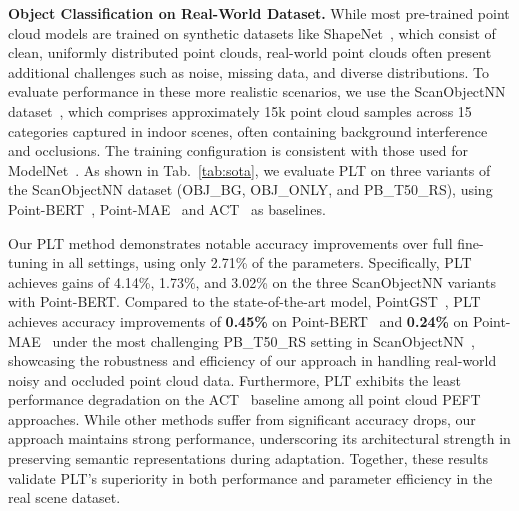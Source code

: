 
\textbf{Object Classification on Real-World Dataset.} While most pre-trained point cloud models are trained on synthetic datasets like ShapeNet~\cite{chang2015shapenet}, which consist of clean, uniformly distributed point clouds, real-world point clouds often present additional challenges such as noise, missing data, and diverse distributions. To evaluate performance in these more realistic scenarios, we use the ScanObjectNN dataset~\cite{uy2019revisiting}, which comprises approximately 15k point cloud samples across 15 categories captured in indoor scenes, often containing background interference and occlusions. The training configuration is consistent with those used for ModelNet~\cite{wu20153d}. As shown in Tab.~\ref{tab:sota}, we evaluate PLT on three variants of the ScanObjectNN dataset (OBJ\_BG, OBJ\_ONLY, and PB\_T50\_RS), using Point-BERT~\cite{yu2022point},  Point-MAE~\cite{pang2022masked} and ACT~\cite{dong2022autoencoders} as baselines.

Our PLT method demonstrates notable accuracy improvements over full fine-tuning in all settings, using only 2.71\% of the parameters. 
Specifically, PLT achieves gains of 4.14\%, 1.73\%, and 3.02\% on the three ScanObjectNN variants with Point-BERT. 
Compared to the state-of-the-art model, PointGST~\cite{liang2024parameter}, PLT achieves accuracy improvements of \textbf{0.45\%} on Point-BERT~\cite{yu2022point} and \textbf{0.24\%} on Point-MAE~\cite{pang2022masked} under the most challenging PB\_T50\_RS setting in ScanObjectNN~\cite{uy2019revisiting}, showcasing the robustness and efficiency of our approach in handling real-world noisy and occluded point cloud data. 
Furthermore, PLT exhibits the least performance degradation on the ACT~\cite{dong2022autoencoders} baseline among all point cloud PEFT approaches. 
While other methods suffer from significant accuracy drops, our approach maintains strong performance, underscoring its architectural strength in preserving semantic representations during adaptation. 
Together, these results validate PLT’s superiority in both performance and parameter efficiency in the real scene dataset.

